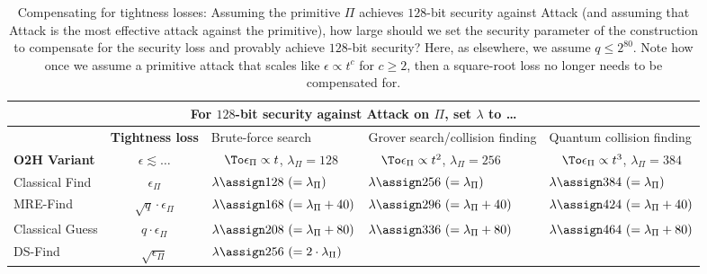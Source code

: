     \begin{table}[h]
      \centering
      \caption{
        \label{tab:compensation}
        Compensating for tightness losses: Assuming the primitive $\Pi$ achieves
        $128$-bit security against Attack (and assuming that Attack
        is the most effective attack against the primitive), how large should we set
        the security parameter of the construction to compensate for the security
        loss and provably achieve $128$-bit security?
        Here, as elsewhere, we assume $q \leq 2^{80}$.
        Note how once we assume a primitive attack that scales like $\epsilon
        \propto t^c$ for $c \geq 2$, then a square-root loss no longer needs to be
        compensated for.
      }
      \begin{tabular}{lc||l|l|l}
        \toprule
        \multicolumn{5}{c}{%
          \textbf{For $128$-bit security against Attack on $\Pi$, set $\lambda$ to \ldots}
        } \\
        \midrule
          & \textbf{Tightness loss}
            & Brute-force search 
              & Grover search/collision finding 
                & Quantum collision finding \\
        \textbf{O2H Variant}
          & $\epsilon \lesssim \ldots$ 
            & $\quad \To \epsilon_\Pi \propto t$, $\lambda_\Pi = 128$ 
              & $\quad \To \epsilon_\Pi \propto t^2$, $\lambda_\Pi = 256$  
                & $\quad \To \epsilon_\Pi \propto t^3$, $\lambda_\Pi = 384$ \\
        \midrule
        \midrule
        Classical Find
          & $\epsilon_\Pi$ 
            & $\lambda \assign 128\ (= \lambda_\Pi)$ 
              & $\lambda \assign 256\ (= \lambda_\Pi)$ 
                & $\lambda \assign 384\ (= \lambda_\Pi)$ \\
        MRE-Find
          & $\sqrt{q} \cdot \epsilon_\Pi$ 
            & $\lambda \assign 168\ (= \lambda_\Pi + 40)$ 
              & $\lambda \assign 296\ (= \lambda_\Pi + 40)$ 
                & $\lambda \assign 424\ (= \lambda_\Pi + 40)$ \\
        Classical Guess
          & $q \cdot \epsilon_\Pi$ 
            & $\lambda \assign 208\ (= \lambda_\Pi + 80)$ 
              & $\lambda \assign 336\ (= \lambda_\Pi + 80)$ 
                & $\lambda \assign 464\ (= \lambda_\Pi + 80)$ \\
        \midrule
        DS-Find
          & $\sqrt{\epsilon_\Pi}$ 
            & $\lambda \assign 256\ (= 2 \cdot \lambda_\Pi)$ 

\end{tabular}
\end{table}
